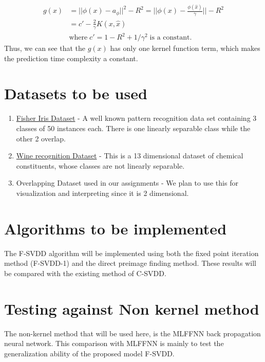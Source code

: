 \documentclass{article} %
\begin{document}
\begin{enumerate}
\begin{equation}
\begin{split}
g(x) &= || \phi(x) - a_\phi||^2 - R^2 = ||\phi(x) - \frac{\phi(\hat{x})}{\gamma} || - R^2 \\
 &=   c' - \frac{2}{\gamma} K(x,\hat{x}) \\
 & \text{where}\;  c' = 1- R^2 + 1/\gamma^2 \; \text{is a constant}.
\end{split}
\end{equation}
Thus, we can see that the $g(x)$ has only one kernel function term, which makes the prediction time complexity a constant.
\end{enumerate}

\section{Datasets to be used}

\begin{enumerate}
\item \href{https://archive.ics.uci.edu/ml/datasets/Iris}{Fisher Iris Dataset} - A well known pattern recognition data set containing 3 classes of 50 instances each. There is one linearly separable class while the other 2 overlap.

\item \href{https://archive.ics.uci.edu/ml/datasets/Wine}{Wine recognition Dataset} - This is a 13 dimensional dataset of chemical constituents, whose classes are not linearly separable. 
\item Overlapping Dataset used in our assignments - We plan to use this for visualization and interpreting since it is 2 dimensional.
\end{enumerate}


\section{Algorithms to be implemented}

The F-SVDD algorithm will be implemented using both the fixed point iteration method (F-SVDD-1) and the direct preimage finding method. These results will be compared with the existing method of C-SVDD. 
\section{Testing against Non kernel method}
The non-kernel method that will be used here, is the MLFFNN back propagation neural network. This comparison with MLFFNN is mainly to test the generalization ability of the proposed model F-SVDD.
\end{document}
